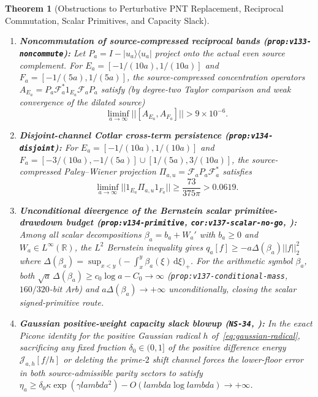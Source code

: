 \documentclass[11pt]{article}
\def\lambda{lambda}%
\def\norm#1{||#1||}%
\newtheorem{theorem}{Theorem}[section]
\theoremstyle{remark}
\newcommand{\norm}[1]{\left\lVert #1\right\rVert}
\newcommand{\dd}{\mathrm d}
\begin{document}
\begin{theorem}[Obstructions to Perturbative PNT Replacement, Reciprocal Commutation, Scalar Primitives, and Capacity Slack]
\begin{enumerate}[label=(\alph*)]
  \item \textbf{Noncommutation of source-compressed reciprocal bands (\texttt{prop:v133-noncommute}):} Let $P_a = I - |u_a\rangle\langle u_a|$ project onto the actual even source complement. For $E_a = [-1/(10a), 1/(10a)]$ and $F_a = [-1/(5a), 1/(5a)]$, the source-compressed concentration operators $A_{E_a} = P_a \mathcal{F}_a^* 1_{E_a}\mathcal{F}_a P_a$ satisfy (by degree-two Taylor comparison and weak convergence of the dilated source)
  \begin{equation}\label{eq:commutator-lower}
    \liminf_{a \to \infty} \norm{[A_{E_a}, A_{F_a}]} > 9 \times 10^{-6}.
  \end{equation}
  \item \textbf{Disjoint-channel Cotlar cross-term persistence (\texttt{prop:v134-disjoint}):} For $E_a = [-1/(10a), 1/(10a)]$ and $F_a = [-3/(10a), -1/(5a)] \cup [1/(5a), 3/(10a)]$, the source-compressed Paley--Wiener projection $\Pi_{a,u} = \mathcal{F}_a P_a \mathcal{F}_a^*$ satisfies
  \begin{equation}\label{eq:cotlar-lower}
    \liminf_{a \to \infty} \norm{1_{E_a}\Pi_{a,u}1_{F_a}} \ge \frac{73}{375\pi} > 0.0619.
  \end{equation}
  \item \textbf{Unconditional divergence of the Bernstein scalar primitive-drawdown budget (\texttt{prop:v134-primitive}, \texttt{cor:v137-scalar-no-go}, ):} Among all scalar decompositions $\beta_a = b_a + W_a'$ with $b_a \ge 0$ and $W_a \in L^\infty(\mathbb{R})$, the $L^2$ Bernstein inequality gives $q_a[f] \ge -a\Delta(\beta_a)\norm{f}_2^2$ where $\Delta(\beta_a) = \sup_{x<y}\bigl(-\int_x^y \beta_a(\xi)\,\dd\xi\bigr)_+$. For the arithmetic symbol $\beta_a$, both $\sqrt{a}\,\Delta(\beta_a) \ge c_0\log a - C_0 \to \infty$ (\texttt{prop:v137-conditional-mass}, $160/320$-bit Arb) and $a\Delta(\beta_a) \to +\infty$ unconditionally, closing the scalar signed-primitive route.
  \item \textbf{Gaussian positive-weight capacity slack blowup (\texttt{NS-34}, ):} In the exact Picone identity for the positive Gaussian radical $h$ of~\eqref{eq:gaussian-radical}, sacrificing any fixed fraction $\delta_0 \in (0,1]$ of the positive difference energy $\mathcal{J}_{a,h}[f/h]$ or deleting the prime-$2$ shift channel forces the lower-floor error in both source-admissible parity sectors to satisfy $\eta_a \ge \delta_0 \kappa \exp(\gamma\lambda^2) - O(\lambda\log\lambda) \to +\infty$.
\end{enumerate}
\end{theorem}
\end{document}
